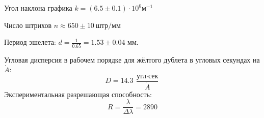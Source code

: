 Угол наклона графика $k = (6.5 \pm 0.1)\cdot 10^6 \text{м}^{-1}$

Число штрихов $n \approx 650 \pm 10\ \text{штр}/\text{мм}$

Период эшелета: $d = \frac{1}{0.65} = 1.53 \pm 0.04$ мм.

Угловая дисперсия в рабочем порядке для жёлтого дублета в угловых секундах на $\dot A$:
\[
D = 14.3\ \frac{\text{угл} \cdot \text{сек}}{\dot A}
\]
Экспериментальная разрешающая способность:
\[
R = \frac{\lambda}{\Delta \lambda} = 2890
\]


